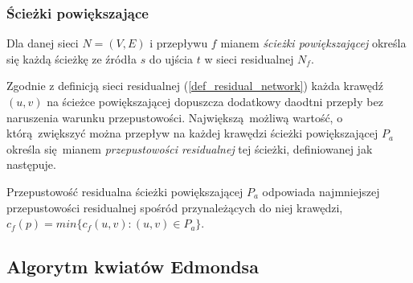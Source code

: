 \subsubsection{Ścieżki powiększające}
  \begin{definition}
    Dla danej sieci $N=(V,E)$ i przepływu $f$ mianem \emph{ścieżki powiększającej} określa się każdą ścieżkę ze źródła $s$ do ujścia $t$ w sieci residualnej $N_f$.
  \end{definition}
  \par{
    Zgodnie z definicją sieci residualnej (\ref{def_residual_network}) każda krawędź $(u, v)$ na ścieżce powiększającej dopuszcza dodatkowy daodtni przepły bez naruszenia warunku przepustowości.
    Największą możliwą wartość, o którą zwiększyć można przepływ na każdej krawędzi ścieżki powiększającej $P_a$ określa się mianem \emph{przepustowości residualnej} tej ścieżki, definiowanej jak następuje.
    \begin{definition}
      Przepustowość residualna ścieżki powiększającej $P_a$ odpowiada najmniejszej przepustowości residualnej spośród przynależących do niej krawędzi, $c_f(p) = min\{c_f(u, v):(u, v)\in P_a\}$.
    \end{definition}
  }
\subsection{Algorytm kwiatów Edmondsa}\label{ss_edmonds}





